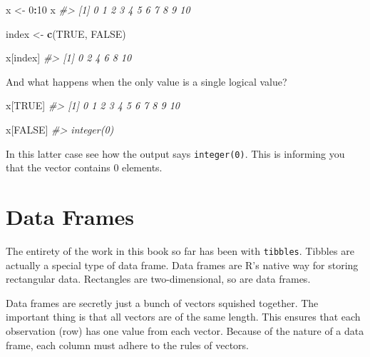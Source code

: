 \documentclass[
]{book}
\newenvironment{Shaded}{\begin{snugshade}}{\end{snugshade}}
\newcommand{\CommentTok}[1]{\textcolor[rgb]{0.56,0.35,0.01}{\textit{#1}}}
\newcommand{\DecValTok}[1]{\textcolor[rgb]{0.00,0.00,0.81}{#1}}
\newcommand{\KeywordTok}[1]{\textcolor[rgb]{0.13,0.29,0.53}{\textbf{#1}}}
\newcommand{\NormalTok}[1]{#1}
\newcommand{\OperatorTok}[1]{\textcolor[rgb]{0.81,0.36,0.00}{\textbf{#1}}}
\newcommand{\OtherTok}[1]{\textcolor[rgb]{0.56,0.35,0.01}{#1}}
\newcommand{\StringTok}[1]{\textcolor[rgb]{0.31,0.60,0.02}{#1}}
\begin{document}
\begin{Shaded}
\begin{Highlighting}[]
\NormalTok{x \textless{}{-}}\StringTok{ }\DecValTok{0}\OperatorTok{:}\DecValTok{10}
\NormalTok{x}
\CommentTok{\#\textgreater{}  [1]  0  1  2  3  4  5  6  7  8  9 10}
\end{Highlighting}
\end{Shaded}

\begin{Shaded}
\begin{Highlighting}[]
\NormalTok{index \textless{}{-}}\StringTok{ }\KeywordTok{c}\NormalTok{(}\OtherTok{TRUE}\NormalTok{, }\OtherTok{FALSE}\NormalTok{)}

\NormalTok{x[index]}
\CommentTok{\#\textgreater{} [1]  0  2  4  6  8 10}
\end{Highlighting}
\end{Shaded}

And what happens when the only value is a single logical value?

\begin{Shaded}
\begin{Highlighting}[]
\NormalTok{x[}\OtherTok{TRUE}\NormalTok{]}
\CommentTok{\#\textgreater{}  [1]  0  1  2  3  4  5  6  7  8  9 10}
\end{Highlighting}
\end{Shaded}

\begin{Shaded}
\begin{Highlighting}[]
\NormalTok{x[}\OtherTok{FALSE}\NormalTok{]}
\CommentTok{\#\textgreater{} integer(0)}
\end{Highlighting}
\end{Shaded}

In this latter case see how the output says \texttt{integer(0)}. This is informing you that the vector contains 0 elements.

\hypertarget{data-frames}{%
\section{Data Frames}\label{data-frames}}

The entirety of the work in this book so far has been with \texttt{tibbles}. Tibbles are actually a special type of data frame. Data frames are R's native way for storing rectangular data. Rectangles are two-dimensional, so are data frames.

Data frames are secretly just a bunch of vectors squished together. The important thing is that all vectors are of the same length. This ensures that each observation (row) has one value from each vector. Because of the nature of a data frame, each column must adhere to the rules of vectors.
\end{document}
